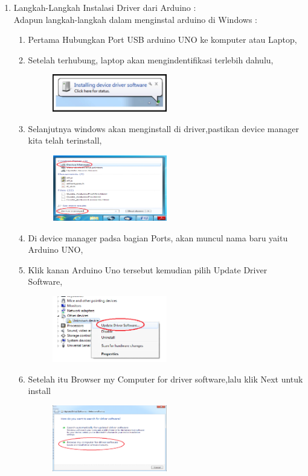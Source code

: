 \begin{enumerate}
\item Langkah-Langkah Instalasi Driver dari Arduino : \\
Adapun langkah-langkah dalam menginstal arduino di Windows :\\
\begin{enumerate}
\item Pertama Hubungkan Port USB arduino UNO ke komputer atau Laptop,
	\item Setelah terhubung, laptop akan mengindentifikasi terlebih dahulu,
	\begin{figure}[ht!]
	\includegraphics[width=5cm]{figures/5/1174062/1.jpg}
	\centering
	\end{figure}
	\item Selanjutnya windows akan menginstall di driver,pastikan device manager kita telah terinstall,
	\begin{figure}[ht!]
	\includegraphics[width=5cm]{figures/5/1174062/2.png}
	\centering
	\end{figure}
	\item Di device manager padsa bagian Ports, akan muncul nama baru yaitu Arduino UNO,
	\item Klik kanan Arduino Uno tersebut kemudian pilih Update Driver Software, 
	\begin{figure}[ht!]
	\includegraphics[width=5cm]{figures/5/1174062/4.png}
	\centering
	\end{figure}
	\item Setelah itu Browser my Computer for driver software,lalu klik Next untuk install
	\begin{figure}[ht!]
	\includegraphics[width=5cm]{figures/5/1174062/5.png}

\end{figure}
\end{enumerate}
\end{enumerate}
